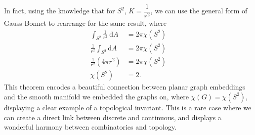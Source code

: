 \documentclass{article}
\begin{document}
\noindent In fact, using the knowledge that for $S^{2}$, $K = \dfrac{1}{r^{2}}$, we can use the general form of Gauss-Bonnet to rearrange for the same result, where
\begin{align*}
    \int_{S^{2}}\frac{1}{r^{2}}\:\mathrm{d}A &= 2\pi\chi(S^{2})\\
    \frac{1}{r^{2}}\int_{S^{2}}\mathrm{d}A &= 2\pi\chi(S^{2})\\
    \frac{1}{r^{2}}(4\pi r^{2}) &= 2\pi\chi(S^{2})\\
    \chi(S^{2}) &= 2.
\end{align*}
This theorem encodes a beautiful connection between planar graph embeddings and the smooth manifold we embedded the graphs on, where $\chi(G) = \chi(S^{2})$, displaying a clear example of a topological invariant. This is a rare case where we can create a direct link between discrete and continuous, and displays a wonderful harmony between combinatorics and topology.

\pagebreak



\printbibliography
\end{document}
